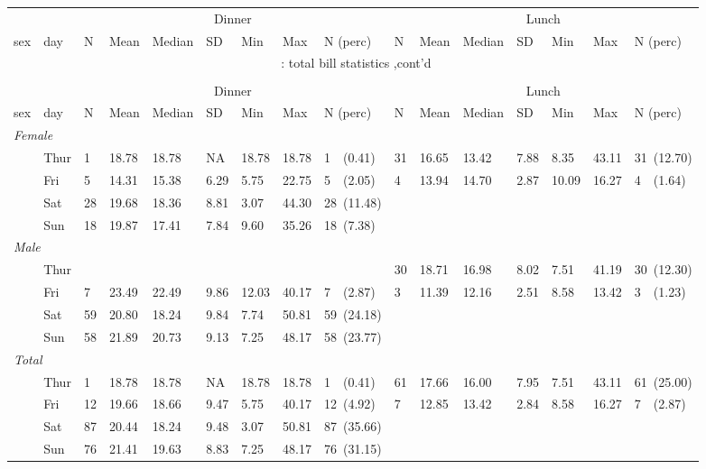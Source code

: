 \documentclass[8pt]{beamer}
\begin{document}
\begin{frame}
\hypertarget{total bill statistics}{} 
\lfoot{\footnotesize }
\footnotesize\begin{longtable}{llllllllllllllll}
\toprule
&&
\multicolumn{7}{c}{Dinner}&\multicolumn{7}{c}{Lunch} \\
\cmidrule(lr){3-9} \cmidrule(lr){10-16}
sex & day & N & Mean & Median & SD & Min & Max & N (perc) & N & Mean & Median & SD & Min & Max & N (perc) \\
\hline
\endfirsthead
\multicolumn{16}{c}{\tablename~\thetable{}: total bill statistics ,cont'd}\\\\
\toprule
&&
\multicolumn{7}{c}{Dinner}&\multicolumn{7}{c}{Lunch} \\
\cmidrule(lr){3-9} \cmidrule(lr){10-16}
sex & day & N & Mean & Median & SD & Min & Max & N (perc) & N & Mean & Median & SD & Min & Max & N (perc) \\
\hline
\endhead
\multicolumn{ 15 }{l}{\textit{ Female }}\\
& Thur & 1 & 18.78 & 18.78 &  NA & 18.78 & 18.78 & 1~~(0.41) & 31 & 16.65 & 13.42 & 7.88 & 8.35 & 43.11 & 31~(12.70) \\
 & Fri & 5 & 14.31 & 15.38 & 6.29 & 5.75 & 22.75 & 5~~(2.05) & 4 & 13.94 & 14.70 & 2.87 & 10.09 & 16.27 & 4~~(1.64) \\
 & Sat & 28 & 19.68 & 18.36 & 8.81 & 3.07 & 44.30 & 28~(11.48) &  &  &  &  &  &  &  \\
 & Sun & 18 & 19.87 & 17.41 & 7.84 & 9.60 & 35.26 & 18~(7.38) &  &  &  &  &  &  &  \\
\multicolumn{ 15 }{l}{\textit{ Male }}\\
& Thur &  &  &  &  &  &  &  & 30 & 18.71 & 16.98 & 8.02 & 7.51 & 41.19 & 30~(12.30) \\
 & Fri & 7 & 23.49 & 22.49 & 9.86 & 12.03 & 40.17 & 7~~(2.87) & 3 & 11.39 & 12.16 & 2.51 & 8.58 & 13.42 & 3~~(1.23) \\
 & Sat & 59 & 20.80 & 18.24 & 9.84 & 7.74 & 50.81 & 59~(24.18) &  &  &  &  &  &  &  \\
 & Sun & 58 & 21.89 & 20.73 & 9.13 & 7.25 & 48.17 & 58~(23.77) &  &  &  &  &  &  &  \\
\multicolumn{ 15 }{l}{\textit{ Total }}\\
& Thur & 1 & 18.78 & 18.78 &  NA & 18.78 & 18.78 & 1~~(0.41) & 61 & 17.66 & 16.00 & 7.95 & 7.51 & 43.11 & 61~(25.00) \\
 & Fri & 12 & 19.66 & 18.66 & 9.47 & 5.75 & 40.17 & 12~(4.92) & 7 & 12.85 & 13.42 & 2.84 & 8.58 & 16.27 & 7~~(2.87) \\
 & Sat & 87 & 20.44 & 18.24 & 9.48 & 3.07 & 50.81 & 87~(35.66) &  &  &  &  &  &  &  \\
 & Sun & 76 & 21.41 & 19.63 & 8.83 & 7.25 & 48.17 & 76~(31.15) &  &  &  &  &  &  &  \\
\bottomrule\end{longtable}
\end{frame}
\end{document}
